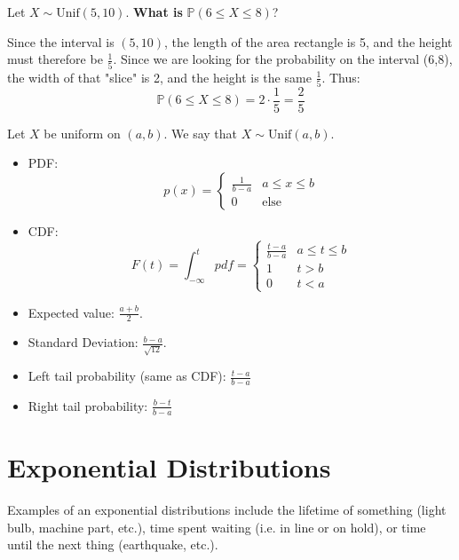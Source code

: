 \documentclass[titlepage, 12pt, leqno]{article}
\begin{document}
\begin{ex}
    Let $X \sim \text{Unif}(5,10)$. \textbf{What is} $\mathbb{P}(6 \le X \le 8)$?
    \vspace{10px}
    
    Since the interval is $(5,10)$, the length of the area rectangle is 5, and the
    height must therefore be $\frac{1}{5}$. Since we are looking for the 
    probability on the interval (6,8), the width of that "slice" is 2, and the 
    height is the same $\frac{1}{5}$. Thus:
    \[
        \boxed{\mathbb{P}(6 \le X \le 8) = 2 \cdot \frac{1}{5} = \frac{2}{5}} 
    \]
\end{ex}

Let $X$ be uniform on $(a,b)$. We say that $X \sim \text{Unif}(a,b)$.
\begin{itemize}
    \item PDF:
        \[
            p(x) = 
            \begin{cases}
                \frac{1}{b-a} & a \le x \le b\\
                0 & \text{else}
            \end{cases}
        \]
   \item CDF:
       \[
           F(t) = \int_{-\infty}^{t}pdf =
           \begin{cases}
               \frac{t-a}{b-a} & a \le t \le b \\
               1 & t > b \\
               0 & t < a
           \end{cases}
           \]
    \item Expected value: $\frac{a+b}{2}$.
    \item Standard Deviation: $\frac{b-a}{\sqrt{12}}$.
    \item Left tail probability (same as CDF): $\frac{t-a}{b-a}$
    \item Right tail probability: $\frac{b-t}{b-a}$
\end{itemize}

\pagebreak
\section{Exponential Distributions}
Examples of an exponential distributions include the lifetime of something (light
bulb, machine part, etc.), time spent waiting (i.e. in line or on hold), or time
until the next thing (earthquake, etc.).
\end{document}
